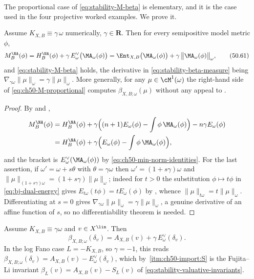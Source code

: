 The proportional case of \eqref{eq:stability-M-beta} is elementary, and it
is the case used in the four projective worked examples. We prove it.

\begin{proposition}
\label{prop:ch50-M-proportional}
Assume $K_{X,B}\equiv\gamma\,\omega$ numerically, $\gamma\in\mathbf R$.
Then for every semipositive model metric $\phi$,
\[
 M^{\NA}_B(\phi)
 =H^{\NA}_B(\phi)+\gamma\,E^\vee_\omega\bigl(\MA_\omega(\phi)\bigr)
 =\Ent_{X,B}\bigl(\MA_\omega(\phi)\bigr)
   +\gamma\,\bigl\|\MA_\omega(\phi)\bigr\|_\omega ,
\tag{50.61}\label{eq:ch50-M-proportional}
\]
and \eqref{eq:stability-M-beta} holds, the derivative in
\eqref{eq:stability-beta-measure} being
$\nabla_{\gamma\omega}\|\mu\|_\omega=\gamma\|\mu\|_\omega$.  More
generally, for any $\mu\in\cM^1(\omega)$ the right-hand side of
\eqref{eq:ch50-M-proportional} computes
$\beta_{X,B;\omega}(\mu)$ without any appeal to
\cite[Theorem~2.15]{BJKS2}.
\end{proposition}

\begin{proof}
By  and
,
\[
 \begin{split}
 M^{\NA}_B(\phi)
 &=H^{\NA}_B(\phi)
  +\gamma\Bigl((n+1)E_\omega(\phi)-\int\phi\,\MA_\omega(\phi)\Bigr)
  -n\gamma E_\omega(\phi)\\
 &=H^{\NA}_B(\phi)
  +\gamma\Bigl(E_\omega(\phi)-\int\phi\,\MA_\omega(\phi)\Bigr),
 \end{split}
\]
and the bracket is $E^\vee_\omega(\MA_\omega(\phi))$ by
\eqref{eq:ch50-min-norm-identities}.  For the last assertion, if
$\omega'=\omega+s\theta$ with $\theta=\gamma\omega$ then
$\omega'=(1+s\gamma)\omega$ and $\|\mu\|_{(1+s\gamma)\omega}
=(1+s\gamma)\|\mu\|_\omega$; indeed for $t>0$ the substitution
$\phi\mapsto t\phi$ in \eqref{eq:bj-dual-energy} gives
$E_{t\omega}(t\phi)=tE_\omega(\phi)$ by
, whence
$\|\mu\|_{t\omega}=t\|\mu\|_\omega$.  Differentiating at $s=0$ gives
$\nabla_{\gamma\omega}\|\mu\|_\omega=\gamma\|\mu\|_\omega$, a genuine
derivative of an affine function of $s$, so no differentiability theorem
is needed.
\end{proof}

\begin{corollary}
\label{cor:ch50-M-dirac}
Assume $K_{X,B}\equiv\gamma\omega$ and $v\in X^{\lin}$.  Then
\[
 \beta_{X,B;\omega}(\delta_v)=A_{X,B}(v)+\gamma\,E^\vee_\omega(\delta_v).
\tag{50.62}\label{eq:ch50-beta-dirac}
\]
In the log Fano case $L=-K_{X,B}$, so $\gamma=-1$, this reads
$\beta_{X,B;\omega}(\delta_v)=A_{X,B}(v)-E^\vee_\omega(\delta_v)$, which
by \,\cref{itm:ch50-import:S} is the Fujita--Li
invariant $\beta_L(v)=A_{X,B}(v)-S_L(v)$ of
\eqref{eq:stability-valuative-invariants}.
\end{corollary}

